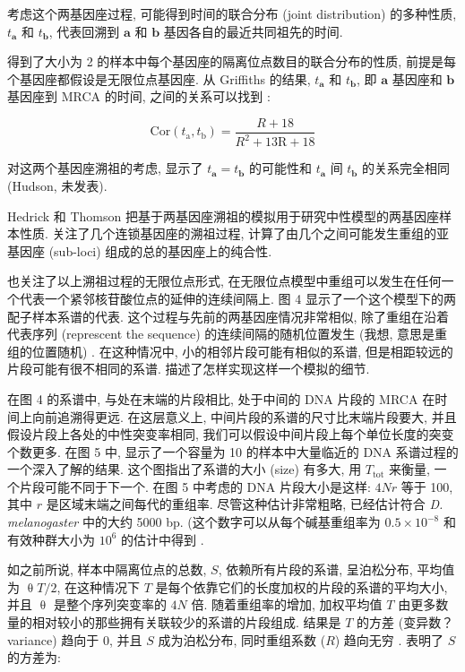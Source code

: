 \documentclass[12pt]{article}
\begin{document}
考虑这个两基因座过程, 可能得到时间的联合分布 (joint distribution) 的多种性质, $t_{\mathbf{a}}$ 和
$t_{\mathbf{b}}$, 代表回溯到 $\mathbf{a}$ 和 $\mathbf{b}$ 基因各自的最近共同祖先的时间.

\textcite{griffiths1981} 得到了大小为 2 的样本中每个基因座的隔离位点数目的联合分布的性质,
前提是每个基因座都假设是无限位点基因座. 从 Griffiths 的结果, $t_{\mathbf{a}}$ 和 $t_{\mathbf{b}}$, 即
$\mathbf{a}$ 基因座和 $\mathbf{b}$ 基因座到 MRCA 的时间, 之间的关系可以找到 \parencite{hudson1983a, kaplan1985}:

\begin{equation} \label{eq:13}
    \text{Cor}(t_{\mathrm{a}},t_{\mathrm{b}})=\frac{R+18}{R^{2}+13\mathrm{R}+18}
\end{equation}

对这两个基因座溯祖的考虑, 显示了 $t_{\mathbf{a}}=t_{\mathbf{b}}$ 的可能性和 $t_{\mathbf{a}}$ 间
$t_{\mathbf{b}}$ 的关系完全相同 (Hudson, 未发表).

Hedrick 和 Thomson 把基于两基因座溯祖的模拟用于研究中性模型的两基因座样本性质. \textcite{kaplan1985}
关注了几个连锁基因座的溯祖过程, 计算了由几个之间可能发生重组的亚基因座 (sub-loci) 组成的总的基因座上的纯合性.

\textcite{hudson1983a, kaplan1985} 也关注了以上溯祖过程的无限位点形式,
在无限位点模型中重组可以发生在任何一个代表一个紧邻核苷酸位点的延伸的连续间隔上. 图 4
显示了一个这个模型下的两配子样本系谱的代表. 这个过程与先前的两基因座情况非常相似, 除了重组在沿着代表序列 (represcent the
sequence) 的连续间隔的随机位置发生 (我想, 意思是重组的位置随机) . 在这种情况中, 小的相邻片段可能有相似的系谱,
但是相距较远的片段可能有很不相同的系谱. \textcite{hudson1983a} 描述了怎样实现这样一个模拟的细节.

在图 4 的系谱中, 与处在末端的片段相比, 处于中间的 DNA 片段的 MRCA 在时间上向前追溯得更远. 在这层意义上,
中间片段的系谱的尺寸比末端片段要大, 并且假设片段上各处的中性突变率相同, 我们可以假设中间片段上每个单位长度的突变个数更多.
在图 5 中, 显示了一个容量为 10 的样本中大量临近的 DNA 系谱过程的一个深入了解的结果. 这个图指出了系谱的大小 (size)
有多大, 用 $T_{\text{tot}}$ 来衡量, 一个片段可能不同于下一个. 在图 5 中考虑的 DNA 片段大小是这样: $4Nr$ 等于 100, 其中
$r$ 是区域末端之间每代的重组率. 尽管这种估计非常粗略, 已经估计符合 \textit{D. melanogaster} 中的大约 5000 bp.
(这个数字可以从每个碱基重组率为 $0.5\times 10^{-8}$ 和有效种群大小为 $10^{6}$ 的估计中得到 \parencite{hudson1987, hudson1988}.

如之前所说, 样本中隔离位点的总数, $S$, 依赖所有片段的系谱, 呈泊松分布, 平均值为 $\uptheta T/2$, 在这种情况下 $T$
是每个依靠它们的长度加权的片段的系谱的平均大小, 并且 $\uptheta$ 是整个序列突变率的 $4N$ 倍. 随着重组率的增加, 加权平均值
$T$ 由更多数量的相对较小的那些拥有关联较少的系谱的片段组成. 结果是 $T$ 的方差 (变异数？ variance) 趋向于 0, 并且 $S$
成为泊松分布, 同时重组系数 ($R$) 趋向无穷 \parencite{ewens2012mathematical}. \textcite{kaplan1985} 表明了 $S$
的方差为:
\end{document}
